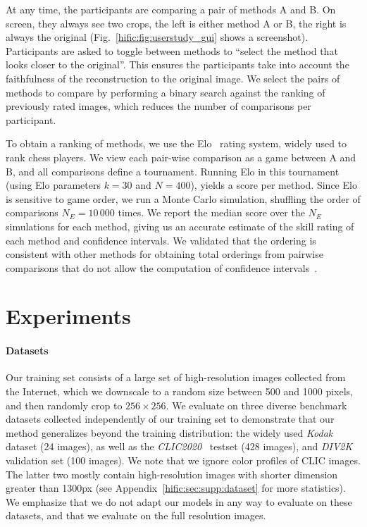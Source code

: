 At any time, the participants are comparing a pair of methods A and B. On screen, they always see two crops, the left is either method A or B, the right is always the original (Fig.~\ref{hific:fig:userstudy_gui} shows a screenshot). 
Participants are asked to toggle between methods to ``select the method that looks closer to the original''.
This ensures the participants take into account the faithfulness of the reconstruction to the original image.
We select the pairs of methods to compare by performing a binary search against the ranking of previously rated images, which reduces the number of comparisons per participant.


To obtain a ranking of methods, we use the Elo~\cite{glickman1995comprehensive} rating system, widely used to rank chess players. We view each pair-wise comparison as a game between A and B, and all comparisons define a tournament.
Running Elo in this tournament (using Elo parameters $k=30$ and $N=400$), 
yields a score per method. 
Since Elo is sensitive to game order, we run a Monte Carlo simulation, shuffling the order of comparisons $N_E{=}10\,000$ times. We report the median score over the $N_E$ simulations for each method, giving us an accurate estimate of the skill rating of each method and confidence intervals. We validated that the ordering is consistent with other methods for obtaining total orderings from pairwise comparisons that do not allow the computation of confidence intervals~\cite{negahban2012iterative,coulom2008whole}.


\section{Experiments} \label{hific:sec:evaluation}

\paragraph{Datasets} Our training set consists of a large set of high-resolution images collected from the Internet, which we downscale to a random size between 500 and 1000 pixels, and then randomly crop to $256{\times}256$. We evaluate on three diverse benchmark datasets collected independently of our training set to demonstrate that our method generalizes beyond the training distribution:
the widely used \emph{Kodak}~\cite{kodakurl} dataset (24 images), as well as the \emph{CLIC2020}~\cite{clic2020} testset (428 images), and \emph{DIV2K}~\cite{agustssondiv2k} validation set (100 images). We note that we ignore color profiles of CLIC images. The latter two mostly contain high-resolution images with shorter dimension greater than 1300px (see Appendix~\ref{hific:sec:supp:dataset} for more statistics). We emphasize that we do not adapt our models in any way to evaluate on these datasets, and that we evaluate on the full resolution images. 

